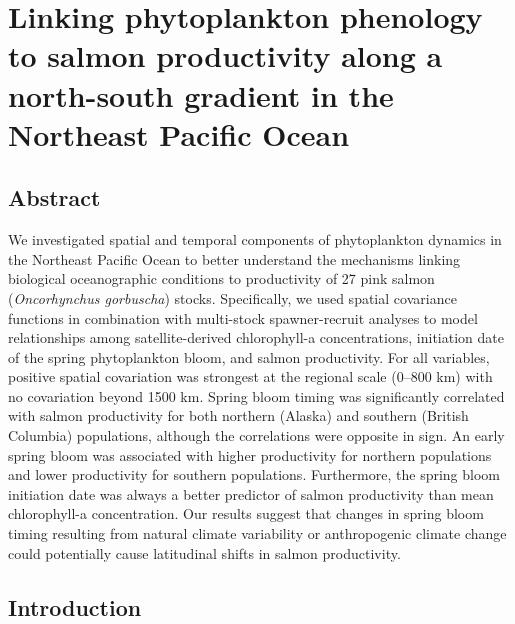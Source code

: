 
\chapter[Phytoplankton phenology as a driver of salmon productivity]{Linking
  phytoplankton phenology to salmon productivity along a north-south gradient in
  the Northeast Pacific Ocean\footnotemark[1]}
\label{ch:bloom}



\section{Abstract}

We investigated spatial and temporal components of phytoplankton dynamics in the
Northeast Pacific Ocean to better understand the mechanisms linking biological
oceanographic conditions to productivity of 27 pink salmon (\emph{Oncorhynchus
gorbuscha}) stocks. Specifically, we used spatial covariance functions in
combination with multi-stock spawner-recruit analyses to model relationships
among satellite-derived chlorophyll-a concentrations, initiation date of the
spring phytoplankton bloom, and salmon productivity. For all variables, positive
spatial covariation was strongest at the regional scale (0--800 km) with no
covariation beyond 1500 km. Spring bloom timing was significantly correlated
with salmon productivity for both northern (Alaska) and southern (British
Columbia) populations, although the correlations were opposite in sign. An early
spring bloom was associated with higher productivity for northern populations
and lower productivity for southern populations. Furthermore, the spring bloom
initiation date was always a better predictor of salmon productivity than mean
chlorophyll-a concentration. Our results suggest that changes in spring bloom
timing resulting from natural climate variability or anthropogenic climate
change could potentially cause latitudinal shifts in salmon productivity.



\section{Introduction}

